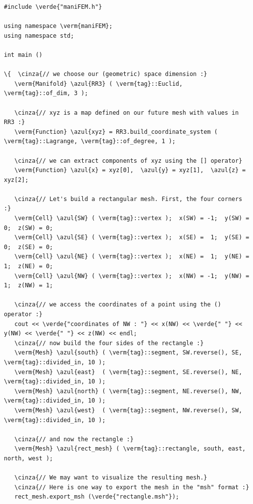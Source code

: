 \begin{Verbatim}[commandchars=\\\{\},formatcom=\small\tt,frame=single,
   label=parag-\ref{\numb section 1.\numb parag 1}.cpp,rulecolor=\color{coment},
   baselinestretch=0.94,framesep=2mm                                            ]
#include \verde{"maniFEM.h"}

using namespace \verm{maniFEM};
using namespace std;

int main ()

\{  \cinza{// we choose our (geometric) space dimension :}
   \verm{Manifold} \azul{RR3} ( \verm{tag}::Euclid, \verm{tag}::of_dim, 3 );
   
   \cinza{// xyz is a map defined on our future mesh with values in RR3 :}
   \verm{Function} \azul{xyz} = RR3.build_coordinate_system ( \verm{tag}::Lagrange, \verm{tag}::of_degree, 1 );

   \cinza{// we can extract components of xyz using the [] operator}
   \verm{Function} \azul{x} = xyz[0],  \azul{y} = xyz[1],  \azul{z} = xyz[2];

   \cinza{// Let's build a rectangular mesh. First, the four corners :}
   \verm{Cell} \azul{SW} ( \verm{tag}::vertex );  x(SW) = -1;  y(SW) = 0;  z(SW) = 0;
   \verm{Cell} \azul{SE} ( \verm{tag}::vertex );  x(SE) =  1;  y(SE) = 0;  z(SE) = 0;
   \verm{Cell} \azul{NE} ( \verm{tag}::vertex );  x(NE) =  1;  y(NE) = 1;  z(NE) = 0;
   \verm{Cell} \azul{NW} ( \verm{tag}::vertex );  x(NW) = -1;  y(NW) = 1;  z(NW) = 1;
   
   \cinza{// we access the coordinates of a point using the () operator :}								
   cout << \verde{"coordinates of NW : "} << x(NW) << \verde{" "} << y(NW) << \verde{" "} << z(NW) << endl;
   \cinza{// now build the four sides of the rectangle :}
   \verm{Mesh} \azul{south} ( \verm{tag}::segment, SW.reverse(), SE, \verm{tag}::divided_in, 10 );
   \verm{Mesh} \azul{east}  ( \verm{tag}::segment, SE.reverse(), NE, \verm{tag}::divided_in, 10 );
   \verm{Mesh} \azul{north} ( \verm{tag}::segment, NE.reverse(), NW, \verm{tag}::divided_in, 10 );
   \verm{Mesh} \azul{west}  ( \verm{tag}::segment, NW.reverse(), SW, \verm{tag}::divided_in, 10 );
   
   \cinza{// and now the rectangle :}
   \verm{Mesh} \azul{rect_mesh} ( \verm{tag}::rectangle, south, east, north, west );

   \cinza{// We may want to visualize the resulting mesh.}
   \cinza{// Here is one way to export the mesh in the "msh" format :}
   rect_mesh.export_msh (\verde{"rectangle.msh"});


\end{Verbatim}
